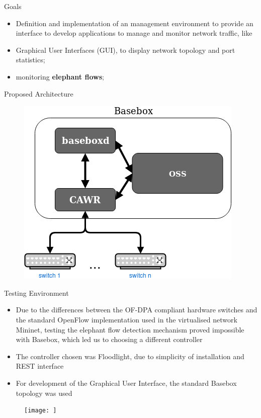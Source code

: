 \documentclass{beamer}
\begin{document}
\begin{frame}{Goals}
    \begin{itemize}
        \item Definition and implementation of an management environment to provide an interface to develop applications 
            to manage and monitor network traffic, like
            \pause 
        \item Graphical User Interfaces (GUI), to display network topology and port statistics;
            \pause
        \item monitoring \textbf{elephant flows};
    \end{itemize}
\end{frame}

\begin{frame}{Proposed Architecture}
    \begin{figure}
        \includegraphics[width=.7\textwidth]{proposed_work/proposed_system}
    \end{figure}
\end{frame}

\begin{frame}{Testing Environment}
    \begin{itemize}
        \item Due to the differences between the OF-DPA compliant hardware switches and the standard OpenFlow implementation used in the virtualised 
            network Mininet, testing the elephant flow detection mechanism proved impossible with Basebox, which led us to choosing a different controller
            \pause 
        \item The controller chosen was Floodlight, due to simplicity of installation and REST interface
        \item For development of the Graphical User Interface, the standard Basebox topology was used
    \end{itemize}
    \begin{figure}
        \texttt{[image: ]}
    \end{figure}
\end{frame}
\end{document}
